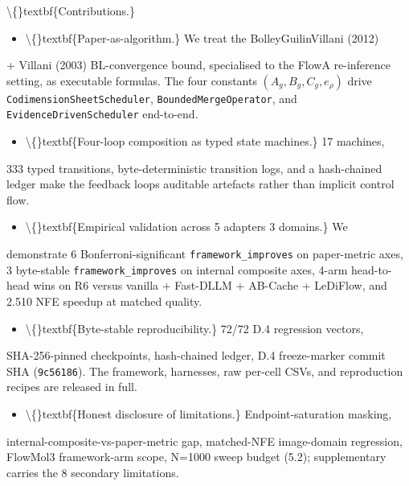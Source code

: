 \documentclass[preprint,3p,times,twocolumn]{elsarticle}
\begin{document}
\textbackslash\{\}textbf\{Contributions.\}

\begin{itemize}
\item \textbackslash\{\}textbf\{Paper-as-algorithm.\} We treat the BolleyGuilinVillani (2012)
\end{itemize}
+ Villani (2003) BL-convergence bound, specialised to the FlowA re-inference setting, as executable formulas. The four constants $(A_g, B_g, C_g, e_\rho)$ drive \texttt{CodimensionSheetScheduler}, \texttt{BoundedMergeOperator}, and \texttt{EvidenceDrivenScheduler} end-to-end.

\begin{itemize}
\item \textbackslash\{\}textbf\{Four-loop composition as typed state machines.\} 17 machines,
\end{itemize}
333 typed transitions, byte-deterministic transition logs, and a hash-chained ledger make the feedback loops auditable artefacts rather than implicit control flow.

\begin{itemize}
\item \textbackslash\{\}textbf\{Empirical validation across 5 adapters  3 domains.\} We
\end{itemize}
demonstrate 6 Bonferroni-significant \texttt{framework\_improves} on paper-metric axes, 3 byte-stable \texttt{framework\_improves} on internal composite axes, 4-arm head-to-head wins on R6 versus vanilla + Fast-DLLM + AB-Cache + LeDiFlow, and 2.510 NFE speedup at matched quality.

\begin{itemize}
\item \textbackslash\{\}textbf\{Byte-stable reproducibility.\} 72/72 D.4 regression vectors,
\end{itemize}
SHA-256-pinned checkpoints, hash-chained ledger, D.4 freeze-marker commit SHA (\texttt{9c56186}). The framework, harnesses, raw per-cell CSVs, and reproduction recipes are released in full.

\begin{itemize}
\item \textbackslash\{\}textbf\{Honest disclosure of limitations.\} Endpoint-saturation masking,
\end{itemize}
internal-composite-vs-paper-metric gap, matched-NFE image-domain regression, FlowMol3 framework-arm scope, N=1000 sweep budget (5.2); supplementary carries the 8 secondary limitations.
\end{document}
